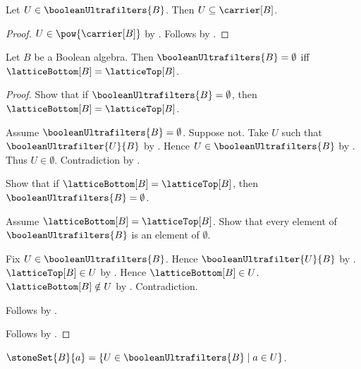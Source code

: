 \begin{proposition}\label{boolean_ultrafilters_member_subseteq_carrier}
    Let $U\in\booleanUltrafilters{B}$.
    Then $U\subseteq\carrier[B]$.
\end{proposition}
\begin{proof}
    $U\in\pow{\carrier[B]}$ by
        .
    Follows by .
\end{proof}

\begin{theorem}\label{boolean_ultrafilters_empty_iff_bottom_eq_top}
    Let $B$ be a Boolean algebra.
    Then $\booleanUltrafilters{B}=\emptyset$ iff
        $\latticeBottom[B]=\latticeTop[B]$.
\end{theorem}
\begin{proof}
    Show that if $\booleanUltrafilters{B}=\emptyset$, then
        $\latticeBottom[B]=\latticeTop[B]$.
    \begin{subproof}
        Assume $\booleanUltrafilters{B}=\emptyset$.
        Suppose not.
        Take $U$ such that $\booleanUltrafilter{U}{B}$ by
            .
        Hence $U\in\booleanUltrafilters{B}$ by
            .
        Thus $U\in\emptyset$.
        Contradiction by .
    \end{subproof}
    Show that if $\latticeBottom[B]=\latticeTop[B]$, then
        $\booleanUltrafilters{B}=\emptyset$.
    \begin{subproof}
        Assume $\latticeBottom[B]=\latticeTop[B]$.
        Show that every element of $\booleanUltrafilters{B}$ is an
            element of $\emptyset$.
        \begin{subproof}
            Fix $U\in\booleanUltrafilters{B}$.
            Hence $\booleanUltrafilter{U}{B}$ by
                .
            $\latticeTop[B]\in U$ by
                .
            Hence $\latticeBottom[B]\in U$.
            $\latticeBottom[B]\notin U$ by
                .
            Contradiction.
        \end{subproof}
        Follows by .
    \end{subproof}
    Follows by \auto.
\end{proof}

\begin{definition}\label{stone_set}
    $\stoneSet{B}{a}=
        \{U\in\booleanUltrafilters{B}\mid a\in U\}$.
\end{definition}

